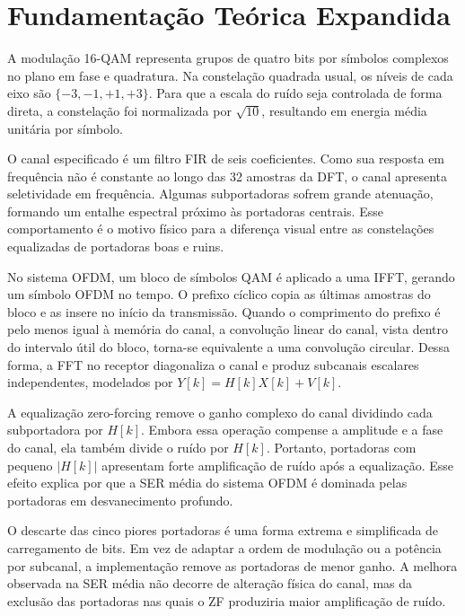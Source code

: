 
\section{Fundamentação Teórica Expandida}

A modulação 16-QAM representa grupos de quatro bits por símbolos complexos no plano em fase e quadratura. Na constelação quadrada usual, os níveis de cada eixo são $\{-3,-1,+1,+3\}$. Para que a escala do ruído seja controlada de forma direta, a constelação foi normalizada por $\sqrt{10}$, resultando em energia média unitária por símbolo.

O canal especificado é um filtro FIR de seis coeficientes. Como sua resposta em frequência não é constante ao longo das 32 amostras da DFT, o canal apresenta seletividade em frequência. Algumas subportadoras sofrem grande atenuação, formando um entalhe espectral próximo às portadoras centrais. Esse comportamento é o motivo físico para a diferença visual entre as constelações equalizadas de portadoras boas e ruins.

No sistema OFDM, um bloco de símbolos QAM é aplicado a uma IFFT, gerando um símbolo OFDM no tempo. O prefixo cíclico copia as últimas amostras do bloco e as insere no início da transmissão. Quando o comprimento do prefixo é pelo menos igual à memória do canal, a convolução linear do canal, vista dentro do intervalo útil do bloco, torna-se equivalente a uma convolução circular. Dessa forma, a FFT no receptor diagonaliza o canal e produz subcanais escalares independentes, modelados por $Y[k]=H[k]X[k]+V[k]$.

A equalização zero-forcing remove o ganho complexo do canal dividindo cada subportadora por $H[k]$. Embora essa operação compense a amplitude e a fase do canal, ela também divide o ruído por $H[k]$. Portanto, portadoras com pequeno $|H[k]|$ apresentam forte amplificação de ruído após a equalização. Esse efeito explica por que a SER média do sistema OFDM é dominada pelas portadoras em desvanecimento profundo.

O descarte das cinco piores portadoras é uma forma extrema e simplificada de carregamento de bits. Em vez de adaptar a ordem de modulação ou a potência por subcanal, a implementação remove as portadoras de menor ganho. A melhora observada na SER média não decorre de alteração física do canal, mas da exclusão das portadoras nas quais o ZF produziria maior amplificação de ruído.
